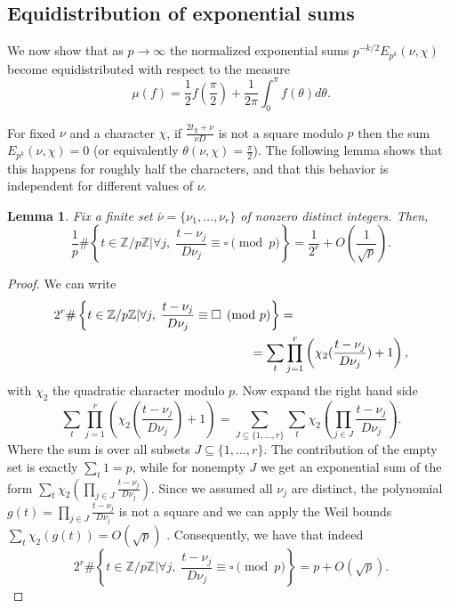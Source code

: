 \documentclass[12pt]{amsart}
\newtheorem{lem}{Lemma}[section]
\theoremstyle{definition}
\theoremstyle{remark}
\numberwithin{equation}{section}
\newcommand{\set}[1]{\left\{#1\right\}}
\newcommand{\bbZ}{\mathbb{Z}}
\begin{document}
\subsection{Equidistribution of exponential sums}
We now show that as $p\to\infty$ the normalized exponential sums
$p^{-k/2}E_{p^k}(\nu,\chi)$ become equidistributed with respect to
the measure \begin{equation}\label{e:measure}
\mu(f)=\frac{1}{2}f(\frac{\pi}{2})+\frac{1}{2\pi}\int_0^{\pi}f(\theta)d\theta.
\end{equation}

For fixed $\nu$ and a character $\chi$, if $\frac{2t_\chi+\nu}{\nu
D}$ is not a square modulo $p$ then the sum $E_{p^k}(\nu,\chi)=0$
(or equivalently $\theta(\nu,\chi)=\frac{\pi}{2}$). The following
lemma shows that this happens for roughly half the characters, and
that this behavior is independent for different values of $\nu$.
\begin{lem}\label{l:square}
Fix a finite set $\bar\nu=\{\nu_1,\ldots,\nu_r\}$ of nonzero distinct integers. Then,
\[\frac{1}{p}\#\set{t\in\bbZ/p\bbZ| \forall j,\;\frac{t-\nu_j}{D\nu_j}\equiv \square\pmod{p}}=\frac{1}{2^r}+O(\frac{1}{\sqrt{p}}).\]
\end{lem}
\begin{proof}
    We can write
    \begin{eqnarray*}\lefteqn{2^r\#\set{t\in\bbZ/p\bbZ| \forall j,\;\frac{t-\nu_j}{D\nu_j}\equiv \square\pmod{p}}=}\\
   &&\quad\quad\quad\quad\quad\quad\quad\quad\quad\quad\quad\quad\quad\quad\quad=\sum_{t}\prod_{j=1}^r\left(\chi_2(\frac{t-\nu_j}{D\nu_j})+1\right),\end{eqnarray*}
    with $\chi_2$ the quadratic character modulo $p$. Now expand the
    right hand side
    \[\sum_{t}\prod_{j=1}^r\left(\chi_2(\frac{t-\nu_j}{D\nu_j})+1\right)=\sum_{J\subseteq \{1,\ldots, r\}}\sum_{t}\chi_2(\prod_{j\in
    J}\frac{t-\nu_j}{D\nu_j}).\]
    Where the sum is over all subsets $J\subseteq \{1,\ldots, r\}$.
    The contribution of the empty set is exactly $\sum_t 1=p$,
    while for nonempty $J$ we get an exponential sum of the form
    $\sum_{t}\chi_2(\prod_{j\in
    J}\frac{t-\nu_j}{D\nu_j})$. Since we assumed all $\nu_j$ are distinct,
    the polynomial $g(t)=\prod_{j\in
    J}\frac{t-\nu_j}{D\nu_j}$ is not a square and we can apply the Weil
    bounds $\sum_{t}\chi_2(g(t))=O(\sqrt{p})$ \cite{Weil48}. Consequently, we have that indeed
    \[2^r\#\set{t\in\bbZ/p\bbZ| \forall j,\;\frac{t-\nu_j}{D\nu_j}\equiv \square\pmod{p}}=p+O(\sqrt{p}).\]
\end{proof}
\end{document}
